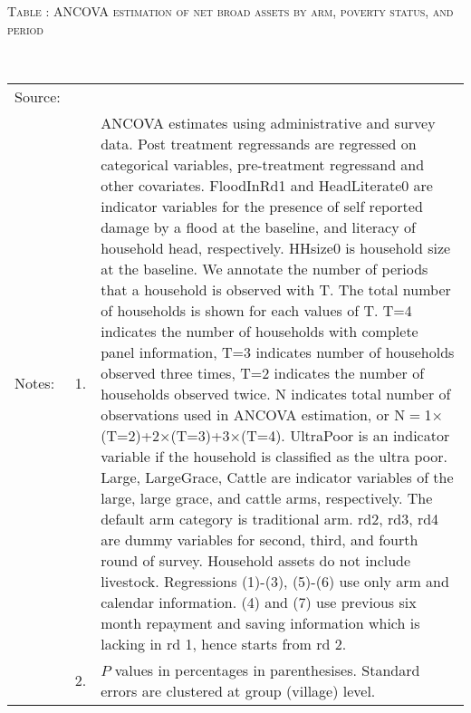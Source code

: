 \hspace{-1cm}\begin{minipage}[t]{14cm}
\hfil\textsc{\normalsize Table \thetable: ANCOVA estimation of net broad assets by arm, poverty status, and period\label{tab ANCOVA net broad assets timevarying poverty status}}\\
\setlength{\tabcolsep}{1pt}
\setlength{\baselineskip}{8pt}
\renewcommand{\arraystretch}{.55}
\hfil{}\\
\renewcommand{\arraystretch}{.8}
\setlength{\tabcolsep}{1pt}
\begin{tabular}{>{\hfill\scriptsize}p{1cm}<{}>{\hfill\scriptsize}p{.25cm}<{}>{\scriptsize}p{12cm}<{\hfill}}
Source:& \multicolumn{2}{l}{\scriptsize Estimated with GUK administrative and survey data.}\\
Notes: & 1. & ANCOVA estimates using administrative and survey data. Post treatment regressands are regressed on categorical variables, pre-treatment regressand and other covariates. \textsf{FloodInRd1} and \textsf{HeadLiterate0} are indicator variables for the presence of self reported damage by a flood at the baseline, and literacy of household head, respectively. \textsf{HHsize0} is household size at the baseline. We annotate the number of periods that a household is observed with \textsf{T}. The total number of households is shown for each values of \textsf{T}. \textsf{T=4} indicates the number of households with complete panel information, \textsf{T=3} indicates number of households observed three times, \textsf{T=2} indicates the number of households observed twice. \textsf{N} indicates total number of observations used in ANCOVA estimation, or \textsf{N$=$1$\times$(T=2)+2$\times$(T=3)+3$\times$(T=4)}.  \textsf{UltraPoor} is an indicator variable if the household is classified as the ultra poor. \textsf{Large}, \textsf{LargeGrace}, \textsf{Cattle} are indicator variables of the \textsf{large}, \textsf{large grace}, and \textsf{cattle} arms, respectively. The default arm category is \textsf{traditional} arm. \textsf{rd2, rd3, rd4} are dummy variables for second, third, and fourth round of survey. Household assets do not include livestock. Regressions (1)-(3), (5)-(6) use only arm and calendar information. (4) and (7) use previous six month repayment and saving information which is lacking in rd 1, hence starts from rd 2.\\
& 2. & $P$ values in percentages in parenthesises. Standard errors are clustered at group (village) level.
\end{tabular}
\end{minipage}

